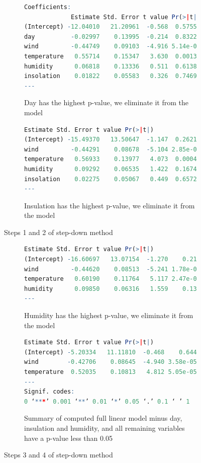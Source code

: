 \documentclass{article}
\begin{document}
    	\begin{figure}[H]
    	\begin{subfigure}[b]{1\linewidth}
	\begin{lstlisting}[language=R]
Coefficients:
             Estimate Std. Error t value Pr(>|t|)    
(Intercept) -12.04010   21.20961  -0.568  0.57553    
day          -0.02997    0.13995  -0.214  0.83227    
wind         -0.44749    0.09103  -4.916 5.14e-05 ***
temperature   0.55714    0.15347   3.630  0.00133 ** 
humidity      0.06818    0.13336   0.511  0.61384    
insolation    0.01822    0.05583   0.326  0.74694    
---

    \end{lstlisting}
    \caption{Day has the highest p-value, we eliminate it from the model}
    \end{subfigure}
    
        	\begin{subfigure}[b]{1\linewidth}
	\begin{lstlisting}[language=R]
             Estimate Std. Error t value Pr(>|t|)    
(Intercept) -15.49370   13.50647  -1.147  0.26219    
wind         -0.44291    0.08678  -5.104 2.85e-05 ***
temperature   0.56933    0.13977   4.073  0.00041 ***
humidity      0.09292    0.06535   1.422  0.16743    
insolation    0.02275    0.05067   0.449  0.65728    
---

    \end{lstlisting}
    \caption{Insulation has the highest p-value, we eliminate it from the model}
    \end{subfigure}
    \caption{Steps 1 and 2 of step-down method}
    \end{figure}
    \begin{figure}[H]
           \begin{subfigure}[b]{1\linewidth}
	\begin{lstlisting}[language=R]
             Estimate Std. Error t value Pr(>|t|)    
(Intercept) -16.60697   13.07154  -1.270    0.215    
wind         -0.44620    0.08513  -5.241 1.78e-05 ***
temperature   0.60190    0.11764   5.117 2.47e-05 ***
humidity      0.09850    0.06316   1.559    0.131    
---
    \end{lstlisting}
    \caption{Humidity has the highest p-value, we eliminate it from the model}
   \end{subfigure}

 	\begin{subfigure}[b]{1\linewidth}
	\begin{lstlisting}[language=R]
            Estimate Std. Error t value Pr(>|t|)    
(Intercept) -5.20334   11.11810  -0.468    0.644    
wind        -0.42706    0.08645  -4.940 3.58e-05 ***
temperature  0.52035    0.10813   4.812 5.05e-05 ***
---
Signif. codes:  
0 ‘***’ 0.001 ‘**’ 0.01 ‘*’ 0.05 ‘.’ 0.1 ‘ ’ 1
    \end{lstlisting}
    \caption{Summary of computed full linear model minus day, insulation and humidity, and all remaining variables have a p-value less than 0.05}
    \end{subfigure}
    \caption{Steps 3 and 4 of step-down method}
    \label{fig:stepdown2}
    \end{figure}
 
\end{document}

